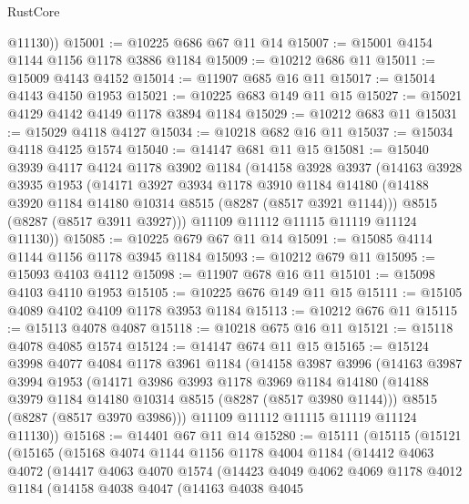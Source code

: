 \begin{lexlean}{RustCore}
\begin{coremodule}
        @11130))
@15001 := @10225 @686 @67 @11 @14
@15007 := @15001 @4154 @1144 @1156 @1178 @3886 @1184
@15009 := @10212 @686 @11
@15011 := @15009 @4143 @4152
@15014 := @11907 @685 @16 @11
@15017 := @15014 @4143 @4150 @1953
@15021 := @10225 @683 @149 @11 @15
@15027 := @15021 @4129 @4142 @4149 @1178 @3894 @1184
@15029 := @10212 @683 @11
@15031 := @15029 @4118 @4127
@15034 := @10218 @682 @16 @11
@15037 := @15034 @4118 @4125 @1574
@15040 := @14147 @681 @11 @15
@15081 := @15040
    @3939
    @4117
    @4124
    @1178
    @3902
    @1184
    (@14158
      @3928
      @3937
      (@14163
        @3928
        @3935
        @1953
        (@14171
          @3927
          @3934
          @1178
          @3910
          @1184
          @14180
          (@14188 @3920 @1184 @14180 @10314 @8515 (@8287 (@8517 @3921 @1144)))
          @8515
          (@8287 (@8517 @3911 @3927)))
        @11109
        @11112
        @11115
        @11119
        @11124
        @11130))
@15085 := @10225 @679 @67 @11 @14
@15091 := @15085 @4114 @1144 @1156 @1178 @3945 @1184
@15093 := @10212 @679 @11
@15095 := @15093 @4103 @4112
@15098 := @11907 @678 @16 @11
@15101 := @15098 @4103 @4110 @1953
@15105 := @10225 @676 @149 @11 @15
@15111 := @15105 @4089 @4102 @4109 @1178 @3953 @1184
@15113 := @10212 @676 @11
@15115 := @15113 @4078 @4087
@15118 := @10218 @675 @16 @11
@15121 := @15118 @4078 @4085 @1574
@15124 := @14147 @674 @11 @15
@15165 := @15124
    @3998
    @4077
    @4084
    @1178
    @3961
    @1184
    (@14158
      @3987
      @3996
      (@14163
        @3987
        @3994
        @1953
        (@14171
          @3986
          @3993
          @1178
          @3969
          @1184
          @14180
          (@14188 @3979 @1184 @14180 @10314 @8515 (@8287 (@8517 @3980 @1144)))
          @8515
          (@8287 (@8517 @3970 @3986)))
        @11109
        @11112
        @11115
        @11119
        @11124
        @11130))
@15168 := @14401 @67 @11 @14
@15280 := @15111
    (@15115
      (@15121
        (@15165
          (@15168
            @4074
            @1144
            @1156
            @1178
            @4004
            @1184
            (@14412
              @4063
              @4072
              (@14417
                @4063
                @4070
                @1574
                (@14423
                  @4049
                  @4062
                  @4069
                  @1178
                  @4012
                  @1184
                  (@14158
                    @4038
                    @4047
                    (@14163
                      @4038
                      @4045

\end{coremodule}
\end{lexlean}

